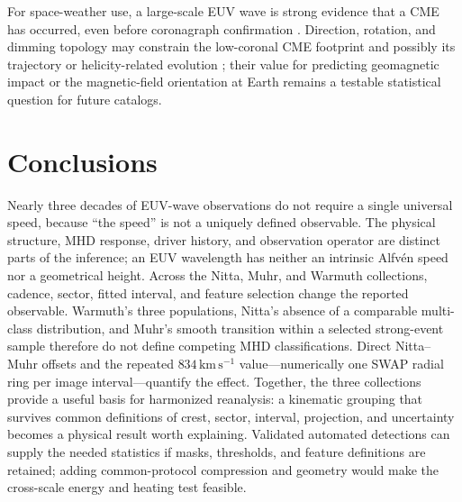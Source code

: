 \documentclass[11pt]{article}
\let\parencite\citep
\newcommand{\kms}{\mathrm{km\,s^{-1}}}
\begin{document}
For space-weather use, a large-scale EUV wave is strong evidence that a CME has occurred, even before coronagraph confirmation \parencite{Green2026}. Direction, rotation, and dimming topology may constrain the low-coronal CME footprint and possibly its trajectory or helicity-related evolution \parencite{Attrill2014}; their value for predicting geomagnetic impact or the magnetic-field orientation at Earth remains a testable statistical question for future catalogs.

\section{Conclusions}

Nearly three decades of EUV-wave observations do not require a single universal speed, because ``the speed'' is not a uniquely defined observable. The physical structure, MHD response, driver history, and observation operator are distinct parts of the inference; an EUV wavelength has neither an intrinsic Alfv\'en speed nor a geometrical height. Across the Nitta, Muhr, and Warmuth collections, cadence, sector, fitted interval, and feature selection change the reported observable. Warmuth's three populations, Nitta's absence of a comparable multi-class distribution, and Muhr's smooth transition within a selected strong-event sample therefore do not define competing MHD classifications. Direct Nitta--Muhr offsets and the repeated $834\,\kms$ value---numerically one SWAP radial ring per image interval---quantify the effect. Together, the three collections provide a useful basis for harmonized reanalysis: a kinematic grouping that survives common definitions of crest, sector, interval, projection, and uncertainty becomes a physical result worth explaining. Validated automated detections can supply the needed statistics if masks, thresholds, and feature definitions are retained; adding common-protocol compression and geometry would make the cross-scale energy and heating test feasible.
\end{document}
